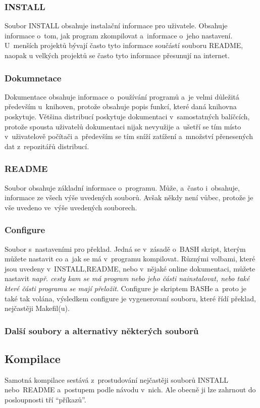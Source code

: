 \documentclass[a4paper,12pt]{article}
\renewcommand{\it}[1]{\textit{#1}}		%
\begin{document}
\subsubsection{INSTALL}
Soubor INSTALL obsahuje instalační informace pro uživatele. Obsahuje informace o~tom, jak program zkompilovat a~informace o~jeho nastavení. U~menších projektů bývají často tyto informace součástí souboru README, naopak u velkých projektů se často tyto informace přesunují na internet.
\subsubsection{Dokumnetace}
Dokumentace obsahuje informace o~používání programů a~je velmi důležitá především u~knihoven, protože obsahuje popis funkcí, které daná knihovna poskytuje. Většina distribucí poskytuje dokumentaci v~samostatných balíčcích, protože spousta uživatelů dokumentaci nijak nevyužije a~ušetří se tím místo v~uživatelově počítači a~především se tím sníží zatížení a~množství přenesených dat z~repozitářů distribucí.
\subsubsection{README}
Soubor obsahuje základní informace o~programu. Může, a~často i~obsahuje, informace ze všech výše uvedených souborů. Avšak někdy není vůbec, protože je vše uvedeno ve~výše uvedených souborech.
\subsubsection{Configure}
Soubor s~nastaveními pro překlad. Jedná se v~zásadě o~BASH skript, kterým můžete nastavit co a~jak se má v~programu kompilovat. Různými volbami, které jsou uvedeny v~INSTALL,README, nebo v~nějaké online dokumentaci, můžete nastavit \it{např. cesty kam se má program nebo jeho části nainstalovat, nebo také které části programu se mají přeložit}. Configure je skriptem BASHe a~proto je také tak volána, výsledkem configure je vygenerovaní souboru, které řídí překlad, nejčastěji Makefil(u).
\subsubsection{Další soubory a alternativy některých souborů}

\subsection{Kompilace}
Samotná kompilace sestává z~prostudování nejčastěji souborů INSTALL nebo README a~postupem podle návodu v~nich. Ale obecně ji lze zahrnout do posloupnosti tří ``příkazů''.
\end{document}
